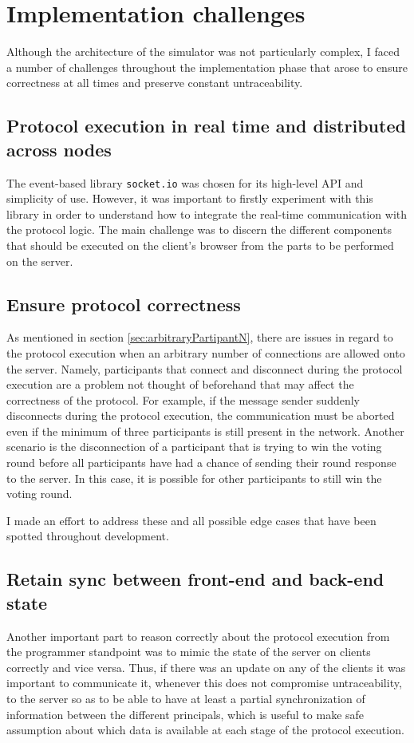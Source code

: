 \section{Implementation challenges}
Although the architecture of the simulator was not particularly complex, I faced a number of challenges throughout the implementation phase that arose to ensure correctness at all times and preserve constant untraceability. 

\subsection{Protocol execution in real time and distributed across nodes}
The event-based library \lstinline{socket.io} was chosen for its high-level API and simplicity of use. However, it was important to firstly experiment with this library in order to understand how to integrate the real-time communication with the protocol logic. The main challenge was to discern the different components that should be executed on the client's browser from the parts to be performed on the server.

\subsection{Ensure protocol correctness}
As mentioned in section \ref{sec:arbitraryPartipantN}, there are issues in regard to the protocol execution when an arbitrary number of connections are allowed onto the server. Namely, participants that connect and disconnect during the protocol execution are a problem not thought of beforehand that may affect the correctness of the protocol. For example, if the message sender suddenly disconnects during the protocol execution, the communication must be aborted even if the minimum of three participants is still present in the network. Another scenario is the disconnection of a participant that is trying to win the voting round before all participants have had a chance of sending their round response to the server. In this case, it is possible for other participants to still win the voting round.

I made an effort to address these and all possible edge cases that have been spotted throughout development.

\subsection{Retain sync between front-end and back-end state}
Another important part to reason correctly about the protocol execution from the programmer standpoint was to mimic the state of the server on clients correctly and vice versa. Thus, if there was an update on any of the clients it was important to communicate it, whenever this does not compromise untraceability, to the server so as to be able to have at least a partial synchronization of information between the different principals, which is useful to make safe assumption about which data is available at each stage of the protocol execution.


